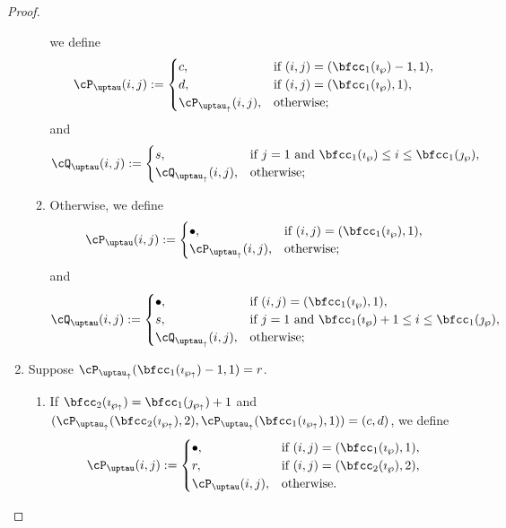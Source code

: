 \documentclass[12pt,a4paper]{amsart}
\numberwithin{equation}{section}
\theoremstyle{remark}
\def\wpu{\wp_{\uparrow}}
\def\wpd{\wp} %
\def\uptauu{\uptau_{\uparrow}}
\def\uptaud{\uptau} %
\begin{document}
\begin{proof}
\begin{enumerate}[label=(\alph*)]
\begin{enumerate}[label={\localtextbulletone}]
     we define
     \[
       \cP_{\uptaud}(i,j) := \begin{cases}
         c ,& \text{if $(i,j)=(\bfcc_{1}(\imath_{\wpd})-1,1)$},\\
         d ,& \text{if $(i,j)=(\bfcc_{1}(\imath_{\wpd}),1)$},\\
         \cP_{\uptauu}(i,j) ,&\text{otherwise};
       \end{cases}
     \]
     and
     \[
       \cQ_{\uptaud}(i,j) := \begin{cases}
         s ,& \text{if $j=1$ and $\bfcc_{1}(\imath_{\wpd})\leq i \leq \bfcc_{1}(\jmath_{\wpd})$},\\
         \cQ_{\uptauu}(i,j) ,&\text{otherwise};
       \end{cases}
     \]
     \item Otherwise, we define
     \[
       \cP_{\uptaud}(i,j) := \begin{cases}
         \bullet ,& \text{if $(i,j)=(\bfcc_{1}(\imath_{\wpd}),1)$},\\
         \cP_{\uptauu}(i,j) ,&\text{otherwise};
       \end{cases}
     \]
     and
     \[
       \cQ_{\uptaud}(i,j) := \begin{cases}
         \bullet ,& \text{if $(i,j)=(\bfcc_{1}(\imath_{\wpd}),1)$},\\
         s ,& \text{if $j=1$ and $\bfcc_{1}(\imath_{\wpd})+1\leq i \leq \bfcc_{1}(\jmath_{\wpd})$},\\
         \cQ_{\uptauu}(i,j) ,&\text{otherwise};
       \end{cases}
     \]
   \end{enumerate}
   \item Suppose $\cP_{\uptauu}(\bfcc_{1}(\imath_{\wpu})-1,1)=r$.
   \begin{enumerate}[label={\localtextbulletone}]
     \item If $\bfcc_{2}(\imath_{\wpu}) = \bfcc_{1}(\jmath_{\wpu})+1$
     and
     $(\cP_{\uptauu}(\bfcc_{2}(\imath_{\wpu}),2),\cP_{\uptauu}(\bfcc_{1}(\imath_{\wpu}),1) ) = (c,d)$,
     we define
     \[
       \cP_{\uptaud}(i,j) := \begin{cases}
         \bullet ,& \text{if $(i,j)=(\bfcc_{1}(\imath_{\wpd}),1)$},\\
         r ,& \text{if $(i,j)=(\bfcc_{2}(\imath_{\wpd}),2)$},\\
         \cP_{\uptaud}(i,j) ,&\text{otherwise}.

\end{cases}\]
\end{enumerate}
\end{enumerate}
\end{proof}
\end{document}
